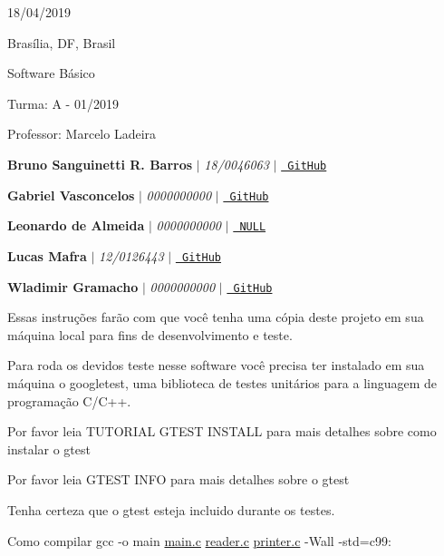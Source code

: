 
\begin{DoxyItemize}
\item 18/04/2019
\item Brasília, DF, Brasil
\item Software Básico
\item Turma\+: A -\/ 01/2019
\item Professor\+: Marcelo Ladeira
\end{DoxyItemize}


\begin{DoxyItemize}
\item {\bfseries{Bruno Sanguinetti R. Barros}} $\vert$ {\itshape 18/0046063} $\vert$ \href{https://github.com/BrunoSNT}{\texttt{ Git\+Hub}}
\item {\bfseries{Gabriel Vasconcelos}} $\vert$ {\itshape 0000000000} $\vert$ \href{https://github.com/gcvasconcelos}{\texttt{ Git\+Hub}}
\item {\bfseries{Leonardo de Almeida}} $\vert$ {\itshape 0000000000} $\vert$ \href{https://github.com/}{\texttt{ N\+U\+LL}}
\item {\bfseries{Lucas Mafra}} $\vert$ {\itshape 12/0126443} $\vert$ \href{https://github.com/LMafra}{\texttt{ Git\+Hub}}
\item {\bfseries{Wladimir Gramacho}} $\vert$ {\itshape 0000000000} $\vert$ \href{https://github.com/wladimirgramacho}{\texttt{ Git\+Hub}}
\end{DoxyItemize}

Essas instruções farão com que você tenha uma cópia deste projeto em sua máquina local para fins de desenvolvimento e teste.

Para roda os devidos teste nesse software você precisa ter instalado em sua máquina o googletest, uma biblioteca de testes unitários para a linguagem de programação C/\+C++.

Por favor leia T\+U\+T\+O\+R\+I\+AL G\+T\+E\+ST I\+N\+S\+T\+A\+LL para mais detalhes sobre como instalar o gtest

Por favor leia G\+T\+E\+ST I\+N\+FO para mais detalhes sobre o gtest

Tenha certeza que o gtest esteja incluido durante os testes. 
\begin{DoxyCode}{0}
\end{DoxyCode}


Como compilar {\ttfamily gcc -\/o main \mbox{\hyperlink{main_8c}{main.\+c}} \mbox{\hyperlink{reader_8c}{reader.\+c}} \mbox{\hyperlink{printer_8c}{printer.\+c}} -\/Wall -\/std=c99}\+: 
\begin{DoxyCode}{0}
\end{DoxyCode}


